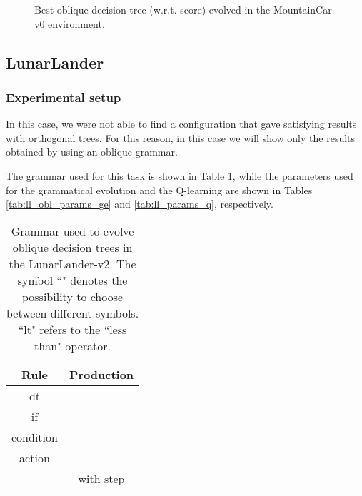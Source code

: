 \documentclass[review,english]{elsarticle}
\begin{document}
\begin{center}
    \begin{figure}
        \centering
        \caption{Best oblique decision tree (w.r.t. score) evolved in the MountainCar-v0 environment.}
        \label{fig:mc_obl_best}
    \end{figure}
\end{center}

\newpage

\subsection{LunarLander}
\subsubsection{Experimental setup}
In this case, we were not able to find a configuration that gave satisfying results with orthogonal trees.
For this reason, in this case we will show only the results obtained by using an oblique grammar.

The grammar used for this task is shown in Table \ref{tab:ll_obl_grammar}, while the parameters used for the grammatical evolution and the Q-learning are shown in Tables \ref{tab:ll_obl_params_ge} and \ref{tab:ll_params_q}, respectively.

\begin{table}[p]
    \centering
    \begin{tabular}{|c|c|} \hline
        \textbf{Rule} & \textbf{Production} \\ \hline
        dt &  \\ if &  \\ condition &  \\ action &  \\  &  with step  \\ \hline
    \end{tabular}
    \caption{Grammar used to evolve oblique decision trees in the LunarLander-v2. The symbol ``" denotes the possibility to choose between different symbols. ``lt" refers to the ``less than" operator.}
    \label{tab:ll_obl_grammar}
\end{table}
\end{document}
